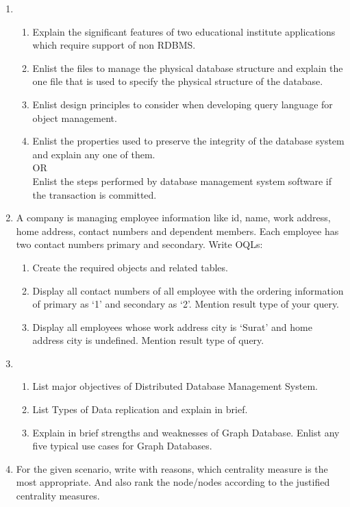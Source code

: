 \documentclass{exmppr}
\begin{document}
\begin{enumerate}

\item \begin{enumerate}
\item Explain the significant features of two educational institute applications which require support of non RDBMS.
\item Enlist the files to manage the physical database structure and explain the one file that is used to specify the physical structure of the database.
\item Enlist design principles to consider when developing query language for object management.
\item Enlist the properties used to preserve the integrity of the database system and explain any one of them.\\
{\centering OR}\\
Enlist the steps performed by database management system software if the transaction is committed.
\end{enumerate}
\item A company is managing employee information like id, name, work address, home address, contact numbers and dependent members. Each employee has two contact numbers primary and secondary. Write OQLs:
\begin{enumerate} 
\item Create the required objects and related tables.
\item Display all contact numbers of all employee with the ordering information of primary as `1' and secondary as `2'. Mention result type of your query.
\item Display all employees whose work address city is `Surat' and home address city is undefined. Mention result type of query.
\end{enumerate}
\item \begin{enumerate}
\item List major objectives of Distributed Database Management System.
\item List Types of Data replication and explain in brief.
\item Explain in brief strengths and weaknesses of Graph Database. Enlist any five typical use cases for Graph Databases.
\end{enumerate}

\item For the given scenario, write with reasons, which centrality measure is the most appropriate. And also rank the node/nodes according to the justified centrality measures.\\
\centering
{}
\end{enumerate}
\end{document}
